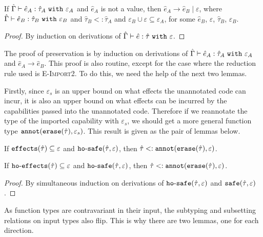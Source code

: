 \begin{theorem}
If $\hat \Gamma \vdash \hat e_A: \hat \tau_A ~\mathtt{with}~ \varepsilon_A$ and
$\hat e_A$ is not a value, then $\hat e_A \longrightarrow \hat e_B \mid \varepsilon$,
where $\hat \Gamma \vdash \hat e_B: \hat \tau_B~\mathtt{with}~ \varepsilon_B$ and
$\hat \tau_B <: \hat \tau_A$ and $\varepsilon_B \cup \varepsilon \subseteq
\varepsilon_A$, for some $\hat e_B$, $\varepsilon$, $\hat \tau_B$, $\varepsilon_B$. 
\end{theorem}

\begin{proof}
By induction on derivations of $\hat \Gamma \vdash \hat e: \hat \tau ~\mathtt{with}~
\varepsilon$.
\end{proof}

The proof of preservation is by induction on derivations of $\hat \Gamma \vdash \hat
e_A: \hat \tau_A~\mathtt{with}~ \varepsilon_A$ and $\hat e_A \longrightarrow \hat e_B$.
This proof is also routine, except for the case where the reduction rule used is
\textsc{E-Import2}. To do this, we need the help of the next two lemmas.

Firstly, since $\varepsilon_s$ is an upper bound on what effects the unannotated code
can incur, it is also an upper bound on what effects can be incurred by the capabilities
passed into the unannotated code. Therefore if we reannotate the type of the imported
capability with $\varepsilon_s$, we should get a more general function type
$\mathtt{annot}(\mathtt{erase}(\hat \tau), \varepsilon_s)$. This result is given as the pair of lemmas
 below.

\begin{lemma}
If $\mathtt{effects}(\hat \tau) \subseteq \varepsilon$ and
$\mathtt{ho \hbox{-} safe}(\hat \tau, \varepsilon)$, then $\hat \tau <: \mathtt{annot}(\mathtt{erase}(\hat \tau), \varepsilon)$.
\end{lemma}

\begin{lemma}
If $\mathtt{ho \hbox{-} effects}(\hat \tau) \subseteq \varepsilon$ and $\mathtt{ho \hbox{-} safe}(\hat \tau, \varepsilon)$,
then $\hat \tau <: \mathtt{annot}(\mathtt{erase}(\hat \tau), \varepsilon)$.
\end{lemma}

\begin{proof}
By simultaneous induction on derivations of $\mathtt{ho \hbox{-} safe}(\hat \tau, \varepsilon)$ and
$\mathtt{safe}(\hat \tau, \varepsilon)$.
\end{proof}

As function types are contravariant in their input, the subtyping and subsetting
relations on input types also flip. This is why there are two lemmas, one for each
direction.

